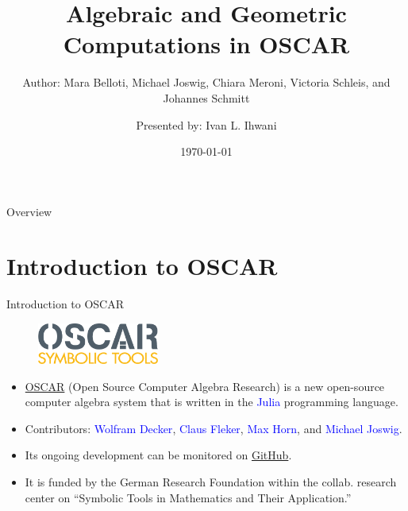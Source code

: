 \documentclass[aspectratio=169,xcolor=dvipsnames]{beamer}
\title[Algebraic \& Geo. Comp. in OSCAR]{Algebraic and Geometric Computations in OSCAR} %
\subtitle{Author: Mara Belloti, Michael Joswig, Chiara Meroni, Victoria Schleis, and Johannes Schmitt}
\author[Ivan L. Ihwani]{Presented by: Ivan L. Ihwani}
\institute[SIAM NEWS SEPTEMBER 2023]{Department of Mathematics \newline National Central University}
\date{\today} %
\begin{document}
\begin{frame}[plain]
    \titlepage
\end{frame}

\begin{frame}{Overview}
    \tableofcontents
\end{frame}

\section{Introduction to OSCAR}
\begin{frame}{Introduction to OSCAR}
\begin{figure}[h]
\includegraphics[width=4cm]{logos/OSCAR_logo.png}
\end{figure}
    \begin{itemize}
        \item \textcolor{blue}{\href{https://www.oscar-system.org/}{OSCAR}} (Open Source Computer Algebra Research) is a new open-source computer algebra system that is written in the \textcolor{blue}{Julia} programming language.
        \item Contributors: \textcolor{blue}{Wolfram Decker}, \textcolor{blue}{Claus Fleker}, \textcolor{blue}{Max Horn}, and \textcolor{blue}{Michael Joswig}. 
        \item Its ongoing development can be monitored on \href{https://github.com/oscar-system}{GitHub}.
        \item It is funded by the German Research Foundation within the collab. research center on \enquote{Symbolic Tools in Mathematics and Their Application.}
    \end{itemize}
\end{frame}
\end{document}
